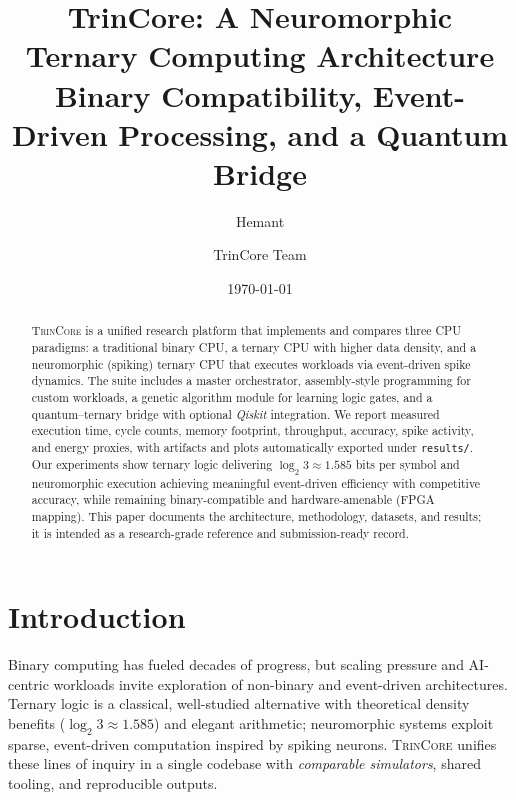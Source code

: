 \documentclass[11pt,a4paper]{article}
\title{\vspace{-1em}\textbf{TrinCore: A Neuromorphic Ternary Computing Architecture}\\
\large Binary Compatibility, Event-Driven Processing, and a Quantum Bridge}
\author{
  Hemant \and TrinCore Team
}
\date{\today}
\newcommand{\bitspertrit}{\ensuremath{\log_2 3 \approx 1.585}}
\newcommand{\project}{\textsc{TrinCore}}
\newcommand{\code}[1]{\texttt{#1}}
\begin{document}
\maketitle

\begin{abstract}
\project{} is a unified research platform that implements and compares three
CPU paradigms: a traditional binary CPU, a ternary CPU with higher data density,
and a neuromorphic (spiking) ternary CPU that executes workloads via event-driven
spike dynamics. The suite includes a master orchestrator, assembly-style
programming for custom workloads, a genetic algorithm module for learning logic
gates, and a quantum--ternary bridge with optional \emph{Qiskit} integration.
We report measured execution time, cycle counts, memory footprint, throughput,
accuracy, spike activity, and energy proxies, with artifacts and plots
automatically exported under \code{results/}. Our experiments show ternary logic
delivering \bitspertrit{} bits per symbol and neuromorphic execution achieving
meaningful event-driven efficiency with competitive accuracy, while remaining
binary-compatible and hardware-amenable (FPGA mapping). This paper documents
the architecture, methodology, datasets, and results; it is intended as a
research-grade reference and submission-ready record.
\end{abstract}

\tableofcontents
\listoffigures
\listoftables
\vspace{1em}

\section{Introduction}
\label{sec:intro}
Binary computing has fueled decades of progress, but scaling pressure and
AI-centric workloads invite exploration of non-binary and event-driven
architectures. Ternary logic is a classical, well-studied alternative with
theoretical density benefits (\bitspertrit{}) and elegant arithmetic; neuromorphic
systems exploit sparse, event-driven computation inspired by spiking neurons.
\project{} unifies these lines of inquiry in a single codebase with
\emph{comparable simulators}, shared tooling, and reproducible outputs.
\end{document}
